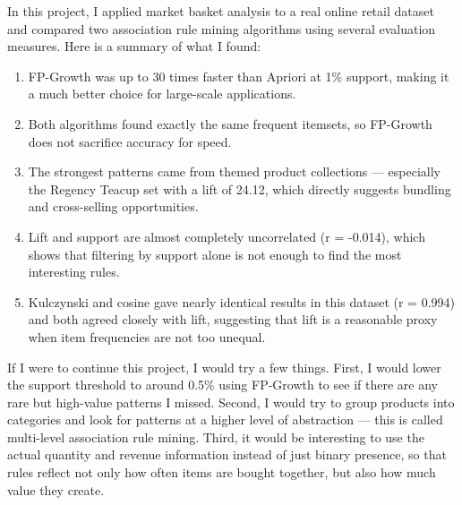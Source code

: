 \documentclass[conference]{IEEEtran}
\begin{document}
In this project, I applied market basket analysis to a real online retail dataset and compared two association rule mining algorithms using several evaluation measures. Here is a summary of what I found:

\begin{enumerate}
    \item FP-Growth was up to 30 times faster than Apriori at 1\% support, making it a much better choice for large-scale applications.
    \item Both algorithms found exactly the same frequent itemsets, so FP-Growth does not sacrifice accuracy for speed.
    \item The strongest patterns came from themed product collections — especially the Regency Teacup set with a lift of 24.12, which directly suggests bundling and cross-selling opportunities.
    \item Lift and support are almost completely uncorrelated (r = -0.014), which shows that filtering by support alone is not enough to find the most interesting rules.
    \item Kulczynski and cosine gave nearly identical results in this dataset (r = 0.994) and both agreed closely with lift, suggesting that lift is a reasonable proxy when item frequencies are not too unequal.
\end{enumerate}

If I were to continue this project, I would try a few things. First, I would lower the support threshold to around 0.5\% using FP-Growth to see if there are any rare but high-value patterns I missed. Second, I would try to group products into categories and look for patterns at a higher level of abstraction — this is called multi-level association rule mining. Third, it would be interesting to use the actual quantity and revenue information instead of just binary presence, so that rules reflect not only how often items are bought together, but also how much value they create.
\end{document}
